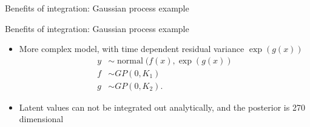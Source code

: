 \documentclass[english,t]{beamer}
\DeclareMathOperator{\normal}{normal}
\begin{document}
\begin{frame}{Benefits of integration: Gaussian process example}

\end{frame}

\begin{frame}{Benefits of integration: Gaussian process example}
  
  \begin{itemize}
  \item<+-> More complex model, with time dependent residual variance
    $\exp(g(x))$
    \begin{align*}
      y & \sim \normal(f(x), \exp(g(x))\\
      f & \sim GP(0, K_1)\\
      g & \sim GP(0, K_2).
    \end{align*}
  \item<+-> Latent values can not be integrated out analytically, and
    the posterior is 270 dimensional
  \end{itemize}
  
\end{frame}
\end{document}

